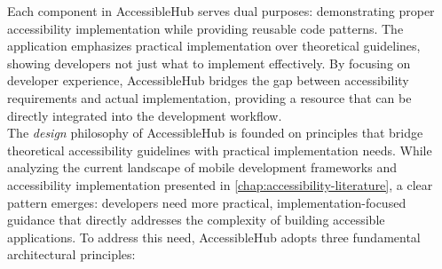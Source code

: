 Each component in AccessibleHub serves dual purposes: demonstrating proper accessibility implementation while providing reusable code patterns. The application emphasizes practical implementation over theoretical guidelines, showing developers not just what to implement effectively. By focusing on developer experience, AccessibleHub bridges the gap between accessibility requirements and actual implementation, providing a resource that can be directly integrated into the development workflow. \\

The \textit{design} philosophy of AccessibleHub is founded on principles that bridge theoretical accessibility guidelines with practical implementation needs. While analyzing the current landscape of mobile development frameworks and accessibility implementation presented in \ref{chap:accessibility-literature}, a clear pattern emerges: developers need more practical, implementation-focused guidance that directly addresses the complexity of building accessible applications. To address this need, AccessibleHub adopts three fundamental architectural principles:

